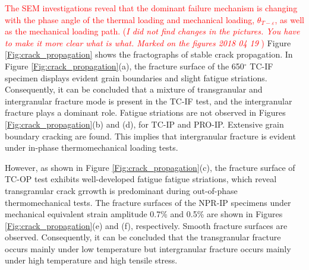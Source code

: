 \documentclass[preprint,5p,twocolumn,11pt,sort&compress]{elsarticle}
\newcommand{\marked}[1]{\textcolor{red}{#1}}
\begin{document}
\marked{The SEM investigations reveal that the dominant failure mechanism is changing with the phase angle of the thermal loading and mechanical loading, $\theta_{T-\varepsilon}$, as well as the mechanical loading path. ({\em I did not find changes in the pictures. You have to make it more clear what is what. Marked on the figures 2018 04 19 })}
Figure \ref{Fig:crack_propagation} shows the fractographs of stable crack propagation.
In Figure \ref{Fig:crack_propagation}(a), the fracture surface of the 650$^\circ$ TC-IF specimen displays evident grain boundaries and slight fatigue striations. Consequently, it can be concluded that a mixture of transgranular and intergranular fracture mode is present in the TC-IF test, and the intergranular fracture plays a dominant role.
Fatigue striations are not observed in Figures \ref{Fig:crack_propagation}(b) and (d), for TC-IP and PRO-IP. Extensive grain boundary cracking are found. This implies that intergranular fracture is evident under in-phase thermomechanical loading tests.

However, as shown in Figure \ref{Fig:crack_propagation}(c), the fracture surface of TC-OP test exhibits well-developed fatigue fatigue striations, which reveal transgranular crack grrowth is predominant during out-of-phase thermomechanical tests. 
The fracture surfaces of the NPR-IP specimens under mechanical equivalent strain amplitude 0.7\% and 0.5\% are shown in Figures \ref{Fig:crack_propagation}(e) and (f), respectively. Smooth fracture surfaces are observed.
Consequently, it can be concluded that the transgranular fracture occurs mainly under low temperature but intergranular fracture occurs mainly under high temperature and high tensile stress. 
\end{document}
